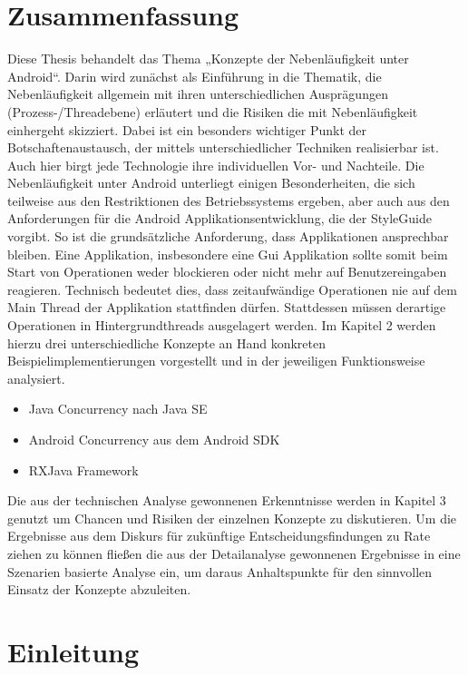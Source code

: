 \documentclass[12pt,oneside,a4paper,bibtotoc,liststotoc]{scrreprt}
\begin{document}
\onehalfspacing %

\chapter*{Zusammenfassung}
Diese Thesis behandelt das Thema „Konzepte der Nebenläufigkeit unter Android“. Darin wird zunächst als Einführung in die Thematik, die Nebenläufigkeit allgemein mit ihren unterschiedlichen Ausprägungen (Prozess-/Threadebene) erläutert und die Risiken die mit Nebenläufigkeit einhergeht skizziert. Dabei ist ein besonders wichtiger Punkt der Botschaftenaustausch, der mittels unterschiedlicher Techniken realisierbar ist. Auch hier birgt jede Technologie ihre individuellen Vor- und Nachteile.
Die Nebenläufigkeit unter Android unterliegt einigen Besonderheiten, die sich teilweise aus den Restriktionen des Betriebssystems ergeben, aber auch aus den Anforderungen für die Android Applikationsentwicklung, die der StyleGuide vorgibt. So ist die grundsätzliche Anforderung, dass Applikationen ansprechbar bleiben. Eine Applikation, insbesondere eine Gui Applikation sollte somit beim Start von Operationen weder blockieren oder nicht mehr auf Benutzereingaben reagieren. Technisch bedeutet dies, dass zeitaufwändige Operationen nie auf dem Main Thread der Applikation stattfinden dürfen. Stattdessen müssen derartige Operationen in Hintergrundthreads ausgelagert werden. Im Kapitel 2 werden hierzu drei unterschiedliche Konzepte an Hand konkreten Beispielimplementierungen vorgestellt und in der jeweiligen Funktionsweise analysiert.
\begin{itemize}
\item Java Concurrency nach Java SE
\item Android Concurrency aus dem Android SDK
\item RXJava Framework
\end{itemize}
Die aus der technischen Analyse gewonnenen Erkenntnisse werden in Kapitel 3 genutzt um Chancen und Risiken der einzelnen Konzepte zu diskutieren. Um die Ergebnisse aus dem Diskurs für zukünftige Entscheidungsfindungen zu Rate ziehen zu können fließen die aus der Detailanalyse gewonnenen Ergebnisse in eine Szenarien basierte Analyse ein, um daraus Anhaltspunkte für den sinnvollen Einsatz der Konzepte abzuleiten.

\tableofcontents
\listoffigures


\chapter{Einleitung}
\end{document}
